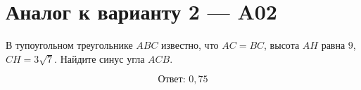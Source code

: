 \documentclass[12pt,a4paper]{article}
\begin{document}
\section*{Аналог к варианту 2 — A02}
В тупоугольном треугольнике \(ABC\) известно, что \(AC=BC\), высота \(AH\) равна \(9\), \(CH=3\sqrt7\). Найдите синус угла \(ACB\).
\begin{center}\figIsoscelesObtuse\end{center}
\[\boxed{\text{Ответ: }0{,}75}\]
\end{document}
